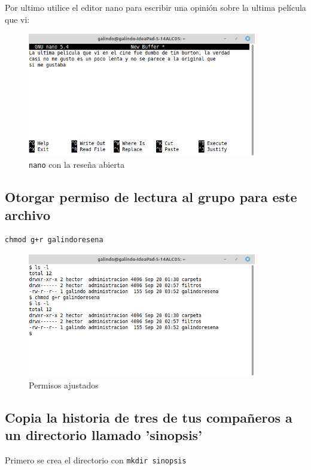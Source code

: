 \documentclass[11pt]{article}
\begin{document}
Por ultimo utilice el editor nano para escribir una opinión sobre la ultima 
película que vi:

\begin{figure}[htbp]
\centering
\includegraphics[width=10cm]{img/nano.png}
\caption[\texttt{nano}]{\texttt{nano} con la reseña abierta}
\end{figure}

\pagebreak

\subsection{Otorgar permiso de lectura al grupo para este archivo}
\label{sec:org42ca5c0}
\begin{verbatim}
chmod g+r galindoresena
\end{verbatim}

\begin{figure}[htbp]
\centering
\includegraphics[width=10cm]{img/asd.png}
\caption{Permisos ajustados}
\end{figure}

\pagebreak

\subsection{Copia la historia de tres de tus compañeros a un directorio llamado 'sinopsis'}
\label{sec:org2176175}
Primero se crea el directorio con \texttt{mkdir sinopsis}
\end{document}
